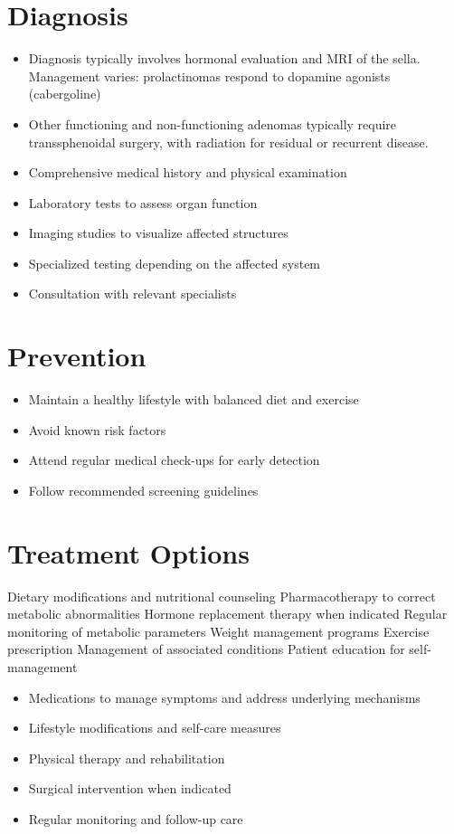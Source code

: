 \section{Diagnosis}
\begin{itemize}[noitemsep]
  \item Diagnosis typically involves hormonal evaluation and MRI of the sella. Management varies: prolactinomas respond to dopamine agonists (cabergoline)
  \item Other functioning and non-functioning adenomas typically require transsphenoidal surgery, with radiation for residual or recurrent disease.
  \item Comprehensive medical history and physical examination
  \item Laboratory tests to assess organ function
  \item Imaging studies to visualize affected structures
  \item Specialized testing depending on the affected system
  \item Consultation with relevant specialists
\end{itemize}
\section{Prevention}
\begin{itemize}[noitemsep]
  \item Maintain a healthy lifestyle with balanced diet and exercise
  \item Avoid known risk factors
  \item Attend regular medical check-ups for early detection
  \item Follow recommended screening guidelines
\end{itemize}
\section{Treatment Options}
Dietary modifications and nutritional counseling Pharmacotherapy to correct metabolic abnormalities Hormone replacement therapy when indicated Regular monitoring of metabolic parameters Weight management programs Exercise prescription Management of associated conditions Patient education for self-management

\begin{itemize}[noitemsep]
  \item Medications to manage symptoms and address underlying mechanisms
  \item Lifestyle modifications and self-care measures
  \item Physical therapy and rehabilitation
  \item Surgical intervention when indicated
  \item Regular monitoring and follow-up care
\end{itemize}
